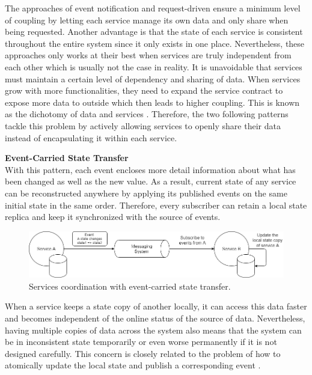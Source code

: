 The approaches of event notification and request-driven ensure a minimum level of coupling by letting each service manage its own data and only share when being requested. Another advantage is that the state of each service is consistent throughout the entire system since it only exists in one place. Nevertheless, these approaches only works at their best when services are truly independent from each other which is usually not the case in reality. It is unavoidable that services must maintain a certain level of dependency and sharing of data. When services grow with more functionalities, they need to expand the service contract to expose more data to outside which then leads to higher coupling. This is known as the dichotomy of data and services \cite{stopford2018designing}. Therefore, the two following patterns tackle this problem by actively allowing services to openly share their data instead of encapsulating it within each service.

\textbf{Event-Carried State Transfer}\\
With this pattern, each event encloses more detail information about what has been changed as well as the new value. As a result, current state of any service can be reconstructed anywhere by applying its published events on the same initial state in the same order. Therefore, every subscriber can retain a local state replica and keep it synchronized with the source of events.

\begin{figure}[h]
	\includegraphics[width=\linewidth]{images/eventstatetransfer.png}
	\caption{Services coordination with event-carried state transfer.}
	\label{fig:eventstatetransfer}
\end{figure}

When a service keeps a state copy of another locally, it can access this data faster and becomes independent of the online status of the source of data. Nevertheless, having multiple copies of data across the system also means that the system can be in inconsistent state temporarily or even worse permanently if it is not designed carefully. This concern is closely related to the problem of how to atomically update the local state and publish a corresponding event \cite{eventstatetransferproblem}.


